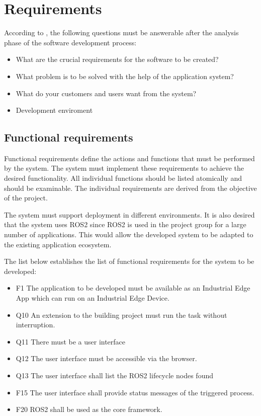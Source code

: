 	\section{Requirements}
	According to \cite{Koubaa2021}, the following questions must be answerable after the analysis phase of the software development process:
	\begin{itemize}
		\item What are the crucial requirements for the software to be created?
		\item What problem is to be solved with the help of the application system?
		\item What do your customers and users want from the system?
		\item Development enviroment
	\end{itemize}

\subsection{Functional requirements}
Functional requirements define the actions and functions that must be performed by the system. The system must implement these requirements to achieve the desired functionality. All individual functions should be listed atomically and should be examinable. The individual requirements are derived from the objective of the project. 

The system must support deployment in different environments. It is also desired that the system uses ROS2 since ROS2 is used in the project group for a large number of applications. This would allow the developed system to be adapted to the existing application ecosystem.

The list below establishes the list of functional requirements for the system to be developed:
\begin{itemize}
	\item F1 The application to be developed must be available as an Industrial Edge App which can run on an Industrial Edge Device.
	\item  	Q10 An extension to the building project must run the task without interruption.
	\item 	Q11 There must be a user interface
	\item 	Q12 The user interface must be accessible via the browser.
	\item 	Q13 The user interface shall list the ROS2 lifecycle nodes found
	\item 	F15 The user interface shall provide status messages of the triggered process.
	\item 	F20 ROS2 shall be used as the core framework.
\end{itemize}

